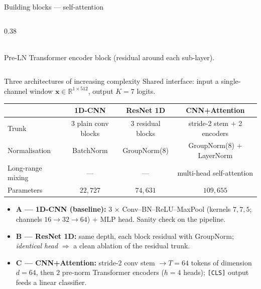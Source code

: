 \documentclass[11pt, aspectratio=169]{beamer}
\newcommand{\R}{\mathbb{R}}
\newcommand{\dCNN}{1D-CNN}
\newcommand{\dResNet}{ResNet 1D}
\newcommand{\dAttn}{CNN+Attention}
\begin{document}
\begin{frame}{Building blocks --- self-attention}
\begin{columns}[T]
\begin{column}{0.38\linewidth}
{}
      \\[0.3em]
      {\scriptsize Pre-LN Transformer encoder block (residual around each
       sub-layer).}
    \end{column}
  \end{columns}
\end{frame}

\begin{frame}{Three architectures of increasing complexity}
  Shared interface: input a single-channel window $\mathbf{x}\in\R^{1\times512}$,
  output $K=7$ logits.
  \begin{table}
    \centering\footnotesize
    \begin{tabular}{lccc}
      \toprule
      & \textbf{\dCNN} & \textbf{\dResNet} & \textbf{\dAttn} \\
      \midrule
      Trunk             & 3 plain conv blocks & 3 residual blocks & stride-2 stem $+$ 2 encoders \\
      Normalisation     & BatchNorm           & GroupNorm(8)      & GroupNorm(8) $+$ LayerNorm \\
      Long-range mixing & ---                 & ---               & multi-head self-attention \\
      Parameters        & $22{,}727$          & $74{,}631$        & $109{,}655$ \\
      \bottomrule
    \end{tabular}
  \end{table}
  \footnotesize
  \begin{itemize}
    \item \textbf{A --- \dCNN{} (baseline):} 3 $\times$
          Conv--BN--ReLU--MaxPool (kernels $7,7,5$; channels
          $16\!\to\!32\!\to\!64$) $+$ MLP head. Sanity check on the pipeline.
    \item \textbf{B --- \dResNet:} same depth, each block residual with
          GroupNorm; \emph{identical head} $\Rightarrow$ a clean ablation of the
          residual trunk.
    \item \textbf{C --- \dAttn:} stride-2 conv stem $\to T=64$ tokens of
          dimension $d=64$, then $2$ pre-norm Transformer encoders ($h=4$ heads);
          \texttt{[CLS]} output feeds a linear classifier.
  \end{itemize}
\end{frame}
\end{document}
